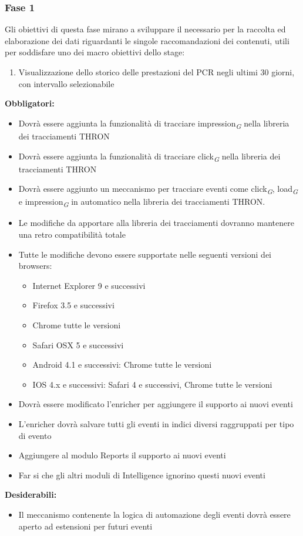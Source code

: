 \documentclass[a4paper, 12pt, twoside, openright]{book}
\newcommand{\gloss}[1]{#1\textsubscript{\textit{\tiny{G}}}}
\begin{document}
\subsubsection{Fase 1}
Gli obiettivi di questa fase mirano a sviluppare il necessario per la raccolta ed elaborazione dei dati riguardanti le singole raccomandazioni dei contenuti, utili per soddisfare uno dei macro obiettivi dello stage:
\begin{enumerate}
	\item Visualizzazione dello storico delle prestazioni del PCR negli ultimi 30 giorni, con intervallo selezionabile
\end{enumerate}
\textbf{Obbligatori:}
\begin{itemize}
\item Dovrà essere aggiunta la funzionalità di tracciare \gloss{impression} nella libreria dei tracciamenti THRON
\item Dovrà essere aggiunta la funzionalità di tracciare \gloss{click} nella libreria dei tracciamenti THRON
\item Dovrà essere aggiunto un meccanismo per tracciare eventi come \gloss{click}, \gloss{load} e 	\gloss{impression} in automatico nella libreria dei tracciamenti THRON.
\item Le modifiche da apportare alla libreria dei tracciamenti dovranno mantenere una retro compatibilità totale
\item Tutte le modifiche devono essere supportate nelle seguenti versioni dei browsers:
	\begin{itemize}
	\item Internet Explorer 9 e successivi
	\item Firefox 3.5 e successivi
	\item Chrome tutte le versioni
	\item Safari OSX 5 e successivi
	\item Android 4.1 e successivi: Chrome tutte le versioni
	\item IOS 4.x e successivi: Safari 4 e successivi, Chrome tutte le versioni
	\end{itemize}
\item Dovrà essere modificato l'enricher per aggiungere il supporto ai nuovi eventi
\item L'enricher dovrà salvare tutti gli eventi in indici diversi raggruppati per tipo di evento
\item Aggiungere al modulo Reports il supporto ai nuovi eventi
\item Far si che gli altri moduli di Intelligence ignorino questi nuovi eventi
\end{itemize}
\textbf{Desiderabili:}
\begin{itemize}
\item Il meccanismo contenente la logica di automazione degli eventi dovrà essere aperto ad estensioni per futuri eventi
\end{itemize}
\end{document}
